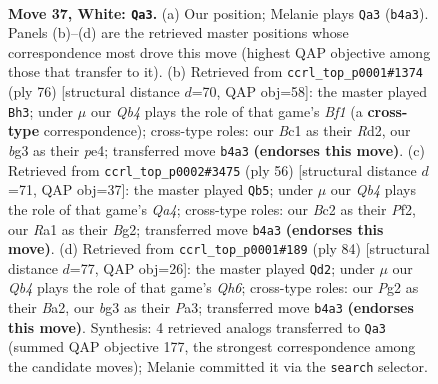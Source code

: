 \documentclass[11pt]{article}
\begin{document}
\clearpage

\begin{figure}[p]\centering
\begin{subfigure}{0.46\textwidth}\centering
\resizebox{\linewidth}{!}{%
\newchessgame
\chessboard[
  setfen={r1b4k/ppp2pp1/5n1p/3q4/1Q6/5PbP/PPB3P1/R1B3K1 w - - 14 37},
  showmover=false,
  pgfstyle=straightmove, color=movearrow, markmove={b4-a3}
]}
\caption{}
\end{subfigure}\hfill
\begin{subfigure}{0.46\textwidth}\centering
\resizebox{\linewidth}{!}{%
\newchessgame
\chessboard[
  setfen={2r4k/2p3p1/2b4p/ppq5/4p2P/1QP1P1P1/P2R1P2/5BK1 w - - 18 39},
  showmover=false,
  pgfstyle=straightmove, color=movearrow, markmove={f1-h3}
]}
\caption{}
\end{subfigure}
\\[4pt]
\begin{subfigure}{0.46\textwidth}\centering
\resizebox{\linewidth}{!}{%
\newchessgame
\chessboard[
  setfen={6k1/pb2rpp1/1p1q3p/3P4/QPp5/P5PP/5PB1/R5K1 w - - 4 29},
  showmover=false,
  pgfstyle=straightmove, color=movearrow, markmove={a4-b5}
]}
\caption{}
\end{subfigure}\hfill
\begin{subfigure}{0.46\textwidth}\centering
\resizebox{\linewidth}{!}{%
\newchessgame
\chessboard[
  setfen={1r4k1/1p1b1p2/p2p1qpQ/3P4/6P1/P6P/BP3P2/4R1K1 w - - 0 43},
  showmover=false,
  pgfstyle=straightmove, color=movearrow, markmove={h6-d2}
]}
\caption{}
\end{subfigure}
\caption{\textbf{Move 37, White: \texttt{Qa3}.} (a) Our position; Melanie plays \texttt{Qa3} (\texttt{b4a3}). Panels (b)--(d) are the retrieved master positions whose correspondence most drove this move (highest QAP objective among those that transfer to it). (b) Retrieved from \texttt{ccrl\_top\_p0001\#1374} (ply 76) [structural distance $d$=70, QAP obj=58]: the master played \texttt{Bh3}; under $\mu$ our \emph{Qb4} plays the role of that game's \emph{Bf1} (a \textbf{cross-type} correspondence); cross-type roles: our \emph{B}c1 as their \emph{R}d2, our \emph{b}g3 as their \emph{p}e4; transferred move \texttt{b4a3} \textbf{(endorses this move)}. (c) Retrieved from \texttt{ccrl\_top\_p0002\#3475} (ply 56) [structural distance $d$=71, QAP obj=37]: the master played \texttt{Qb5}; under $\mu$ our \emph{Qb4} plays the role of that game's \emph{Qa4}; cross-type roles: our \emph{B}c2 as their \emph{P}f2, our \emph{R}a1 as their \emph{B}g2; transferred move \texttt{b4a3} \textbf{(endorses this move)}. (d) Retrieved from \texttt{ccrl\_top\_p0001\#189} (ply 84) [structural distance $d$=77, QAP obj=26]: the master played \texttt{Qd2}; under $\mu$ our \emph{Qb4} plays the role of that game's \emph{Qh6}; cross-type roles: our \emph{P}g2 as their \emph{B}a2, our \emph{b}g3 as their \emph{P}a3; transferred move \texttt{b4a3} \textbf{(endorses this move)}. Synthesis: 4 retrieved analogs transferred to \texttt{Qa3} (summed QAP objective 177, the strongest correspondence among the candidate moves); Melanie committed it via the \texttt{search} selector.}
\label{fig:thought-m72}
\end{figure}
\end{document}

